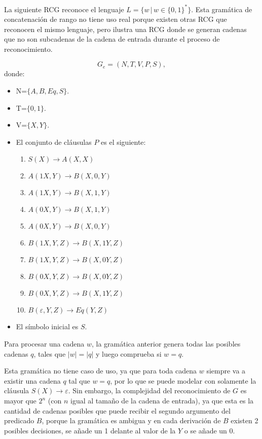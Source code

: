 \documentclass{article}
\begin{document}
La siguiente RCG reconoce el lenguaje $L=\{w\,|\,w\in\{0,1\}^*\}$. Esta gramática de concatenación de rango no tiene uso real porque existen otras RCG que reconocen el mismo lenguaje, pero ilustra una RCG donde se generan cadenas que no son subcadenas de la cadena de entrada durante el proceso de reconocimiento.

\[
    G_e = (N, T, V, P, S),
\]
donde:

\begin{itemize}
    \item  N=$\{A,B,Eq,S\}$.
    \item T=$\{0,1\}$.
    \item V=$\{X,Y\}$.
    \item El conjunto de cláusulas $P$ es el siguiente:
          \begin{enumerate}
              \item $S(X)\to A(X,X)$
              \item $A(1X,Y)\to B(X,0,Y)$
              \item $A(1X,Y)\to B(X,1,Y)$
              \item $A(0X,Y)\to B(X,1,Y)$
              \item $A(0X,Y)\to B(X,0,Y)$
              \item $B(1X,Y,Z)\to B(X,1Y,Z)$
              \item $B(1X,Y,Z)\to B(X,0Y,Z)$
              \item $B(0X,Y,Z)\to B(X,0Y,Z)$
              \item $B(0X,Y,Z)\to B(X,1Y,Z)$
              \item $B(\varepsilon,Y,Z)\to Eq(Y,Z)$
          \end{enumerate}

    \item El símbolo inicial es $S$.
\end{itemize}

Para procesar una cadena $w$, la gramática anterior genera todas las posibles cadenas $q$, tales que $|w|=|q|$ y luego comprueba si $w = q$.

Esta gramática no tiene caso de uso, ya que para toda cadena $w$ siempre va a existir una cadena $q$ tal que $w=q$,
por lo que se puede modelar con solamente la cláusula $S(X)\to \varepsilon$. Sin embargo, la complejidad del
reconocimiento de $G$ es mayor que $2^n$ (con $n$ igual al tamaño de la cadena de entrada), ya que esta es la
cantidad de cadenas posibles que puede recibir el segundo argumento del predicado $B$, porque la gramática es
ambigua y en cada derivación de $B$ existen 2 posibles decisiones, se añade un 1 delante al valor de la $Y$ o
se añade un $0$.
\end{document}
